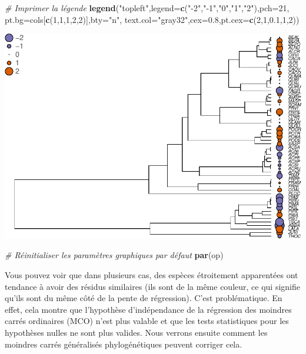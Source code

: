 \documentclass[
]{book}
\newenvironment{Shaded}{\begin{snugshade}}{\end{snugshade}}
\newcommand{\AttributeTok}[1]{\textcolor[rgb]{0.13,0.29,0.53}{#1}}
\newcommand{\CommentTok}[1]{\textcolor[rgb]{0.56,0.35,0.01}{\textit{#1}}}
\newcommand{\DecValTok}[1]{\textcolor[rgb]{0.00,0.00,0.81}{#1}}
\newcommand{\FloatTok}[1]{\textcolor[rgb]{0.00,0.00,0.81}{#1}}
\newcommand{\FunctionTok}[1]{\textcolor[rgb]{0.13,0.29,0.53}{\textbf{#1}}}
\newcommand{\NormalTok}[1]{#1}
\newcommand{\StringTok}[1]{\textcolor[rgb]{0.31,0.60,0.02}{#1}}
\begin{document}
\begin{Shaded}
\begin{Highlighting}[]
\CommentTok{\# Imprimer la légende}
\FunctionTok{legend}\NormalTok{(}\StringTok{"topleft"}\NormalTok{,}\AttributeTok{legend=}\FunctionTok{c}\NormalTok{(}\StringTok{"{-}2"}\NormalTok{,}\StringTok{"{-}1"}\NormalTok{,}\StringTok{"0"}\NormalTok{,}\StringTok{"1"}\NormalTok{,}\StringTok{"2"}\NormalTok{),}\AttributeTok{pch=}\DecValTok{21}\NormalTok{,}
       \AttributeTok{pt.bg=}\NormalTok{cols[}\FunctionTok{c}\NormalTok{(}\DecValTok{1}\NormalTok{,}\DecValTok{1}\NormalTok{,}\DecValTok{1}\NormalTok{,}\DecValTok{2}\NormalTok{,}\DecValTok{2}\NormalTok{)],}\AttributeTok{bty=}\StringTok{"n"}\NormalTok{,}
       \AttributeTok{text.col=}\StringTok{"gray32"}\NormalTok{,}\AttributeTok{cex=}\FloatTok{0.8}\NormalTok{,}\AttributeTok{pt.cex=}\FunctionTok{c}\NormalTok{(}\DecValTok{2}\NormalTok{,}\DecValTok{1}\NormalTok{,}\FloatTok{0.1}\NormalTok{,}\DecValTok{1}\NormalTok{,}\DecValTok{2}\NormalTok{))}
\end{Highlighting}
\end{Shaded}

\begin{center}\includegraphics{pcm-workshop_files/figure-latex/Residuals of lm on phylogeny-1} \end{center}

\begin{Shaded}
\begin{Highlighting}[]
\CommentTok{\# Réinitialiser les paramètres graphiques par défaut}
\FunctionTok{par}\NormalTok{(op) }
\end{Highlighting}
\end{Shaded}

Vous pouvez voir que dans plusieurs cas, des espèces étroitement apparentées ont tendance à avoir des résidus similaires (ils sont de la même couleur, ce qui signifie qu'ils sont du même côté de la pente de régression). C'est problématique. En effet, cela montre que l'hypothèse d'indépendance de la régression des moindres carrés ordinaires (MCO) n'est plus valable et que les tests statistiques pour les hypothèses nulles ne sont plus valides. Nous verrons ensuite comment les moindres carrés généralisés phylogénétiques peuvent corriger cela.
\end{document}
